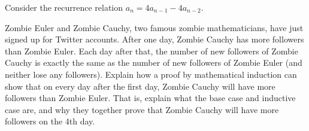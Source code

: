 \begin{questions}
\begin{parts}
\end{parts}






\question Consider the recurrence relation $a_n = 4a_{n-1} - 4a_{n-2}$.







\question Zombie Euler and Zombie Cauchy, two famous zombie mathematicians, have just signed up for Twitter accounts.  After one day, Zombie Cauchy has more followers than Zombie Euler.  Each day after that, the number of new followers of Zombie Cauchy is exactly the same as the number of new followers of Zombie Euler (and neither lose any followers).  Explain how a proof by mathematical induction can show that on every day after the first day, Zombie Cauchy will have more followers than Zombie Euler.  That is, explain what the base case and inductive case are, and why they together prove that Zombie Cauchy will have more followers on the 4th day.


\end{questions}
